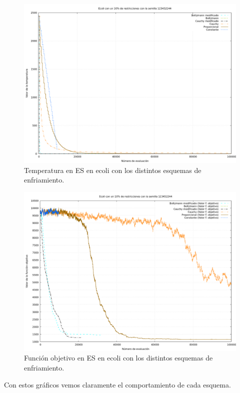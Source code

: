 \documentclass[12pt, spanish]{article}
\begin{document}
\begin{figure}[H]
	\centering
	\includegraphics[scale = 0.35]{cmp-tmp/ecoli-temp.png}
	
	\caption{Temperatura en ES en ecoli con los distintos esquemas de enfriamiento.}
	\label{fig:es-cmp2}
\end{figure}

\begin{figure}[H]
	\centering
	\includegraphics[scale = 0.35]{cmp-tmp/ecoli-es.png}
	
	\caption{Función objetivo en ES en ecoli con los distintos esquemas de enfriamiento.}
	\label{fig:es-cmp1}
\end{figure}


Con estos gráficos vemos claramente el comportamiento de cada esquema.
\end{document}
